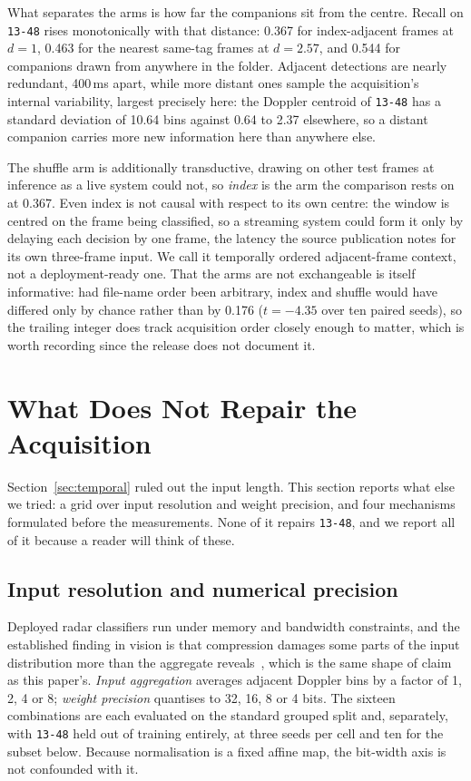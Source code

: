 \documentclass[11pt,a4paper]{article}
\newcommand{\s}[1]{\texttt{#1}}            %
\newcommand{\tgt}{\s{13-48}}               %
\begin{document}
What separates the arms is how far the companions sit from the centre. Recall on \tgt{} rises monotonically with that distance: 0.367 for index-adjacent frames at $d = 1$, 0.463 for the nearest same-tag frames at $d = 2.57$, and 0.544 for companions drawn from anywhere in the folder. Adjacent detections are nearly redundant, 400\,ms apart, while more distant ones sample the acquisition's internal variability, largest precisely here: the Doppler centroid of \tgt{} has a standard deviation of 10.64 bins against 0.64 to 2.37 elsewhere, so a distant companion carries more new information here than anywhere else.

The shuffle arm is additionally transductive, drawing on other test frames at inference as a live system could not, so \emph{index} is the arm the comparison rests on at 0.367. Even index is not causal with respect to its own centre: the window is centred on the frame being classified, so a streaming system could form it only by delaying each decision by one frame, the latency the source publication notes for its own three-frame input. We call it temporally ordered adjacent-frame context, not a deployment-ready one. That the arms are not exchangeable is itself informative: had file-name order been arbitrary, index and shuffle would have differed only by chance rather than by 0.176 ($t = -4.35$ over ten paired seeds), so the trailing integer does track acquisition order closely enough to matter, which is worth recording since the release does not document it.

\section{What Does Not Repair the Acquisition}
\label{sec:compress}

Section~\ref{sec:temporal} ruled out the input length. This section reports
what else we tried: a grid over input resolution and weight precision, and
four mechanisms formulated before the measurements. None of it repairs
\tgt, and we report all of it because a reader will think of these.

\subsection{Input resolution and numerical precision}

Deployed radar classifiers run under memory and bandwidth constraints, and
the established finding in vision is that compression damages some parts of
the input distribution more than the aggregate reveals~\cite{hooker2019,hooker2020,tran2022},
which is the same shape of claim as this paper's. \emph{Input aggregation}
averages adjacent Doppler bins by a factor of 1, 2, 4 or 8; \emph{weight
precision} quantises to 32, 16, 8 or 4 bits. The sixteen combinations are
each evaluated on the standard grouped split and, separately, with \tgt{}
held out of training entirely, at three seeds per cell and ten for the
subset below. Because normalisation is a fixed affine map, the bit-width
axis is not confounded with it.
\end{document}

